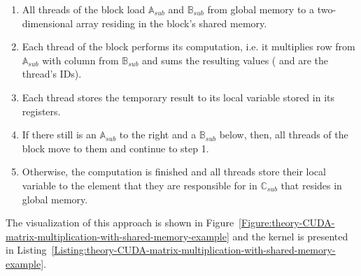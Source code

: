 \begin{enumerate}
	\item All threads of the block load $ \mathbb{A}_{sub} $ and $ \mathbb{B}_{sub} $ from global memory to a two-dimensional array residing in the block's shared memory.
	\item Each thread of the block performs its computation, i.e. it multiplies row  from\space $ \mathbb{A}_{sub} $ with column  from $ \mathbb{B}_{sub} $ and sums the resulting values ( and  are the thread's IDs).
	\item Each thread stores the temporary result to its local variable  stored in its registers.
	\item If there still is an $ \mathbb{A}_{sub} $ to the right and a $ \mathbb{B}_{sub} $ below, then, all threads of the block move to them and continue to step 1.
	\item Otherwise, the computation is finished and all threads store their local variable  to the element that they are responsible for in $ \mathbb{C}_{sub} $ that resides in global memory.
\end{enumerate}

The visualization of this approach is shown in Figure~\ref{Figure:theory-CUDA-matrix-multiplication-with-shared-memory-example} and the kernel is presented in Listing~\ref{Listing:theory-CUDA-matrix-multiplication-with-shared-memory-example}.

